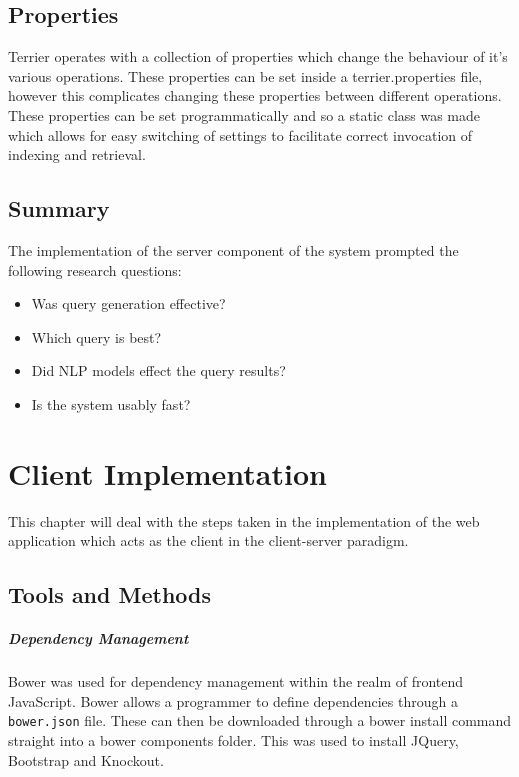 \documentclass{l4proj}
\newcommand{\code}[1]{\texttt{#1}}
\begin{document}
\section{Properties}
Terrier operates with a collection of properties which change the behaviour of it's various operations. These properties can be set inside a terrier.properties file, however this complicates changing these properties between different operations. These properties can be set programmatically and so a static class was made which allows for easy switching of settings to facilitate correct invocation of indexing and retrieval.

\section{Summary} \label{serversummary}
The implementation of the server component of the system prompted the following research questions:
\begin{itemize}
\item Was query generation effective?
\item Which query is best?
\item Did NLP models effect the query results?
\item Is the system usably fast?
\end{itemize}

\chapter{Client Implementation} \label{clientimplementation}
This chapter will deal with the steps taken in the implementation of the web application which acts as the client in the client-server paradigm.

\section{Tools and Methods}
\paragraph{Dependency Management}
Bower was used for dependency management within the realm of frontend JavaScript. Bower allows a programmer to define dependencies through a \code{bower.json} file. These can then be downloaded through a bower install command straight into a bower components folder. This was used to install JQuery, Bootstrap and Knockout.
\end{document}
